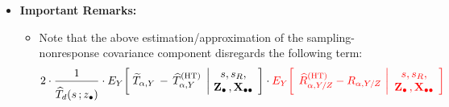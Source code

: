 \begin{itemize}
\begin{eqnarray*}
{        2
        \cdot
        \left(\,
            \dfrac{1}{T_{\alpha,Z} \slash N}
            \,\right)
        \left(\,
            \dfrac{
                {\color{white}.}
                {\color{gray}T_{\alpha,Z}} \,-\, \widehat{T}_{d}(s\,;\zdot)
                {\color{white}.}
                }{
                \overset{{\color{white}.}}{
                    N
                    }
                }           
            \,\right)
        \cdot
        \dfrac{
            1
            }{
            \overset{{\color{white}.}}{
                \left. \widehat{T}_{d}(s\,;\zdot)^{2} \right\slash N^{2}
                }
            }
        \cdot
        \left(\,
            \dfrac{
                \underset{l \in s_{R}}{\sum}\,
                W^{(+)}_{d,l}\,d_{l}\,\sigma_{l}^{2}
                \;\;-\;
                \underset{k \in s_{M}}{\sum}\,
                w_{k}\,d_{k}^{2}\,\sigma_{k}^{2}
                }{
                \overset{{\color{white}.}}{N^{2}}                
                }
            \,\right)
        }
    \end{eqnarray*}
\item
    \textbf{Important Remarks:}
    \begin{itemize}
    \item
        Note that the above estimation/approximation
        of the sampling-nonresponse covariance component
        disregards the following term:
        \begin{equation*}
        2
        \cdot
        \dfrac{
            1
            }{
            \overset{{\color{white}.}}{
                \widehat{T}_{d}(s\,;\zdot)
                }
            }
        \cdot
        E_{Y}\!\left[\;
            \widetilde{T}_{\alpha,Y}
            \, - \,
            \widehat{T}^{\textnormal{(HT)}}_{\alpha,Y}
            \;\left\vert\!
            \begin{array}{c}
                s,s_{R},
                \\
                \Zdot\,,\Xobs
                \end{array}
            \right.
            \!\right]
        \cdot
        {\color{red}E_{Y}\!\left[\;\,
            \widehat{R}^{\textnormal{(HT)}}_{\alpha,Y/Z} - R_{\alpha,Y/Z}
            \,\left\vert
            \begin{array}{c}
                s,s_{R},
                \\
                \Zdot\,,\Xobs
                \end{array}
            \right.
            \!\right]}

\end{equation*}
\end{itemize}
\end{itemize}
